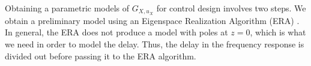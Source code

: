 \documentclass[journal,twocolumn,twoside]{IEEEtran}
\begin{document}


Obtaining a parametric models of $G_{X,u_X}$ for control design involves two steps. We obtain a preliminary model using an Eigenspace Realization Algorithm (ERA) \cite{Jacques_sysidfrf}. In general, the ERA does not produce a model with poles at $z=0$, which is what we need in order to model the delay. Thus, the delay in the frequency response is divided out before passing it to the ERA algorithm.
\end{document}
